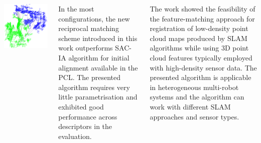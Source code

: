 \documentclass[28pt, a4paper, landscape]{tikzposter}
\begin{document}
\begin{columns}
{\begin{minipage}[t]{0.24\linewidth}
\begin{tikzfigure}
  \includegraphics[width=\linewidth]{matches.png}
\end{tikzfigure}
\end{minipage}

In the most configurations, the new reciprocal matching scheme introduced in this work outperforms \gls{SAC-IA} algorithm for initial alignment available in the \gls{PCL}. The presented algorithm requires very little parametrisation and exhibited good performance across descriptors in the evaluation.

\vspace{1em}

The work showed the feasibility of the feature-matching approach for registration of low-density point cloud maps produced by \gls{SLAM} algorithms while using \gls{3D} point cloud features typically employed with high-density sensor data. The presented algorithm is applicable in heterogeneous multi-robot systems and the algorithm can work with different \gls{SLAM} approaches and sensor types.
} %

\end{columns}
\end{document}
